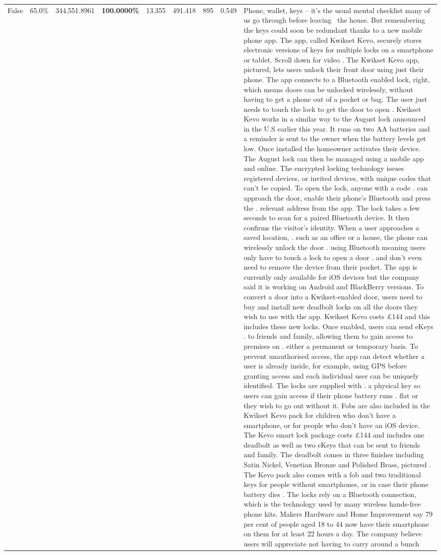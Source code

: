 \begin{table}[H]
\begin{tabular}{lllrlllll}
False & 65.0\% & 344,551.8961 & \bfseries \color{red} 100.0000\% & 13.355 & 491.418 & 895 & 0.549 & Phone, wallet, keys – it’s the usual mental checklist many of us go through before leaving  the house. But remembering the keys could soon be redundant thanks to a new mobile phone app. The app, called Kwikset Kevo, securely stores electronic versions of keys for multiple locks on a smartphone or tablet. Scroll down for video . The Kwikset Kevo app, pictured, lets users unlock their front door using just their phone. The app connects to a Bluetooth enabled lock, right, which means doors can be unlocked wirelessly, without having to get a phone out of a pocket or bag. The user just needs to touch the lock to get the door to open . Kwikset Kevo works in a similar way to the August lock announced in the U.S earlier this year. It runs on two AA batteries and a reminder is sent to the owner when the battery levels get low. Once installed the homeowner activates their device. The August lock can then be managed using a mobile app and online. The encrypted locking technology issues registered devices, or invited devices, with unique codes that can't be copied. To open the lock, anyone with a code . can approach the door, enable their phone's Bluetooth and press the . relevant address from the app. The lock takes a few seconds to scan for a paired Bluetooth device. It then confirms the visitor's identity. When a user approaches a saved location, . such as an office or a house, the phone can wirelessly unlock the door . using Bluetooth meaning users only have to touch a lock to open a door . and don't even need to remove the device from their pocket. The app is currently only available for iOS devices but the company said it is working on Android and BlackBerry versions. To convert a door into a Kwikset-enabled door, users need to buy and install new deadbolt locks on all the doors they wish to use with the app. Kwikset Kevo costs £144 and this includes these new locks. Once enabled, users can send eKeys . to friends and family, allowing them to gain access to premises on . either a permanent or temporary basis. To prevent unauthorised access, the app can detect whether a user is already inside, for example, using GPS before granting access and each individual user can be uniquely identified. The locks are supplied with . a physical key so users can gain access if their phone battery runs . flat or they wish to go out without it. Fobs are also included in the Kwikset Kevo pack for children who don't have a smartphone, or for people who don't have an iOS device. The Kevo smart lock package costs £144 and includes one deadbolt as well as two eKeys that can be sent to friends and family. The deadbolt comes in three finishes including Satin Nickel, Venetian Bronze and Polished Brass, pictured . The Kevo pack also comes with a fob and two traditional keys for people without smartphones, or in case their phone battery dies . The locks rely on a Bluetooth connection, which is the technology used by many wireless hands-free phone kits. Makers Hardware and Home Improvement say 79 per cent of people aged 18 to 44 now have their smartphone on them for at least 22 hours a day. The company believe users will appreciate not having to carry around a bunch 
\end{tabular}
\end{table}
